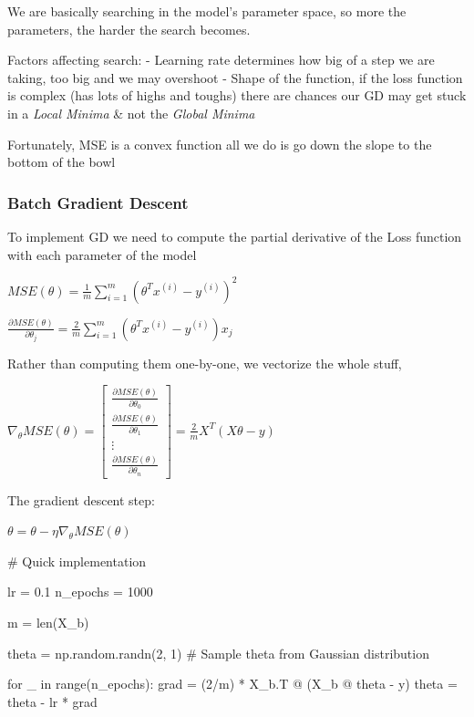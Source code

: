 \documentclass[
]{report}
\newenvironment{Shaded}{\begin{snugshade}}{\end{snugshade}}
\newcommand{\BuiltInTok}[1]{\textcolor[rgb]{0.00,0.23,0.31}{#1}}
\newcommand{\CommentTok}[1]{\textcolor[rgb]{0.37,0.37,0.37}{#1}}
\newcommand{\ControlFlowTok}[1]{\textcolor[rgb]{0.00,0.23,0.31}{#1}}
\newcommand{\DecValTok}[1]{\textcolor[rgb]{0.68,0.00,0.00}{#1}}
\newcommand{\FloatTok}[1]{\textcolor[rgb]{0.68,0.00,0.00}{#1}}
\newcommand{\KeywordTok}[1]{\textcolor[rgb]{0.00,0.23,0.31}{#1}}
\newcommand{\NormalTok}[1]{\textcolor[rgb]{0.00,0.23,0.31}{#1}}
\newcommand{\OperatorTok}[1]{\textcolor[rgb]{0.37,0.37,0.37}{#1}}
\begin{document}
We are basically searching in the model's parameter space, so more the
parameters, the harder the search becomes.

Factors affecting search: - Learning rate determines how big of a step
we are taking, too big and we may overshoot - Shape of the function, if
the loss function is complex (has lots of highs and toughs) there are
chances our GD may get stuck in a \emph{Local Minima} \& not the
\emph{Global Minima}

Fortunately, MSE is a convex function all we do is go down the slope to
the bottom of the bowl

\hypertarget{batch-gradient-descent}{%
\subsubsection{Batch Gradient Descent}\label{batch-gradient-descent}}

To implement GD we need to compute the partial derivative of the Loss
function with each parameter of the model

\(MSE(\theta) = \frac{1}{m} \sum_{i=1}^m (\theta^T x^{(i)} - y^{(i)})^2\)

\(\frac{\partial MSE(\theta)}{\partial \theta_{j}} = \frac{2}{m} \sum_{i=1}^m (\theta^T x^{(i)} - y^{(i)}) x_{j}\)

Rather than computing them one-by-one, we vectorize the whole stuff,

\(\nabla_{\theta}MSE(\theta) = \begin{bmatrix} \frac{\partial MSE(\theta)}{\partial \theta_{0}} \\ \frac{\partial MSE(\theta)}{\partial \theta_{1}} \\ \vdots \\ \frac{\partial MSE(\theta)}{\partial \theta_{n}} \end{bmatrix} = \frac{2}{m} X^{T} (X\theta - y)\)

The gradient descent step:

\(\theta = \theta - \eta\nabla_{\theta}MSE(\theta)\)

\begin{Shaded}
\begin{Highlighting}[]
\CommentTok{\# Quick implementation}

\NormalTok{lr }\OperatorTok{=} \FloatTok{0.1}
\NormalTok{n\_epochs }\OperatorTok{=} \DecValTok{1000}

\NormalTok{m }\OperatorTok{=} \BuiltInTok{len}\NormalTok{(X\_b)}

\NormalTok{theta }\OperatorTok{=}\NormalTok{ np.random.randn(}\DecValTok{2}\NormalTok{, }\DecValTok{1}\NormalTok{) }\CommentTok{\# Sample theta from Gaussian distribution}

\ControlFlowTok{for}\NormalTok{ \_ }\KeywordTok{in} \BuiltInTok{range}\NormalTok{(n\_epochs):}
\NormalTok{    grad }\OperatorTok{=}\NormalTok{ (}\DecValTok{2}\OperatorTok{/}\NormalTok{m) }\OperatorTok{*}\NormalTok{ X\_b.T }\OperatorTok{@}\NormalTok{ (X\_b }\OperatorTok{@}\NormalTok{ theta }\OperatorTok{{-}}\NormalTok{  y)}
\NormalTok{    theta }\OperatorTok{=}\NormalTok{ theta }\OperatorTok{{-}}\NormalTok{ lr }\OperatorTok{*}\NormalTok{ grad}
\end{Highlighting}
\end{Shaded}
\end{document}
